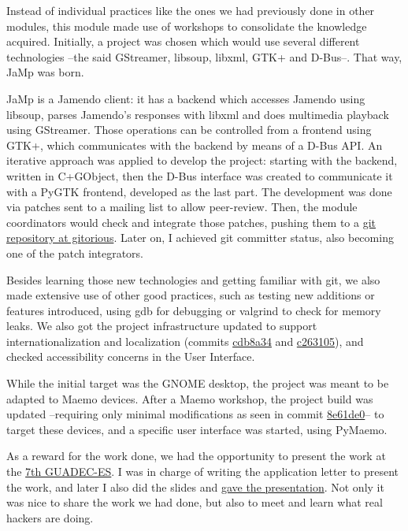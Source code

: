 Instead of individual practices like the ones we had previously done in other modules, this module made use of
workshops to consolidate the knowledge acquired. Initially, a project was chosen which would use several different technologies
--the said GStreamer, libsoup, libxml, GTK+ and D-Bus--. That way, JaMp was born.

JaMp is a Jamendo client: it has a backend which accesses Jamendo using libsoup, parses Jamendo's responses with
libxml and does multimedia playback using GStreamer. Those operations can be controlled from a frontend using GTK+, which
communicates with the backend by means of a D-Bus API. An iterative approach was applied to develop the project: starting with
the backend, written in C+GObject, then the D-Bus interface was created to communicate it with a PyGTK frontend, developed as the last part.
The development was done via patches sent to a mailing list to allow peer-review. Then, the module coordinators would check and integrate
those patches, pushing them to a \href{http://gitorious.org/mswl2010/jamp}{git repository at gitorious}. Later on, I achieved git committer status, also becoming one of the patch integrators.

Besides learning those new technologies and getting familiar with git, we also made extensive use of other good practices, such as
testing new additions or features introduced, using gdb for debugging or valgrind to check for memory leaks. We also got the project
infrastructure updated to support internationalization and localization (commits \href{http://gitorious.org/mswl2010/jamp/commit/cdb8a34f092f8011380437fb3d56f8e5b5c773a6}{cdb8a34} and \href{http://gitorious.org/mswl2010/jamp/commit/c26310539097d9a5bae4b8a1c9d1ced5ed0c8f65}{c263105}), and checked accessibility concerns in the User Interface.

While the initial target was the GNOME desktop, the project was meant to be adapted to
Maemo devices. After a Maemo workshop, the project build was updated
--requiring only minimal modifications as seen in commit \href{http://gitorious.org/mswl2010/jamp/commit/8e61de095265e5892bcac49f95a0def6029bbd00}{8e61de0}-- to target these devices, and a specific user
interface was started, using PyMaemo.

As a reward for the work done, we had the opportunity to present the work at the \href{http://2010.guadec.es/}{7th GUADEC-ES}. I was in charge of writing the application letter to present the work, and later I also did the
slides and \href{http://2010.guadec.es/guadec/programa}{gave the presentation}. Not only it was nice to share the work we had done, but
also to meet and learn what real hackers are doing.

